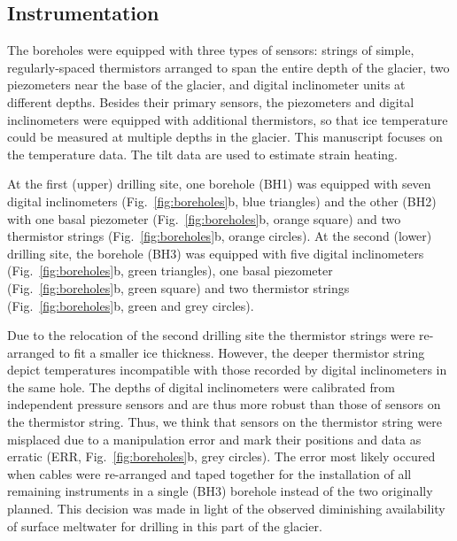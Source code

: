 \documentclass[utf8]{article}
\begin{document}
\subsection{Instrumentation}

    The boreholes were equipped with three types of sensors: strings of simple,
    regularly-spaced thermistors arranged to span the entire depth of the
    glacier, two piezometers near the base of the glacier, and digital
    inclinometer units at different depths. Besides their primary sensors, the
    piezometers and digital inclinometers were equipped with additional
    thermistors, so that ice temperature could be measured at multiple depths
    in the glacier. This manuscript focuses on the temperature data. The tilt
    data are used to estimate strain heating.

    At the first (upper) drilling site, one borehole (BH1) was equipped with
    seven digital inclinometers (Fig.~\ref{fig:boreholes}b, blue triangles) and
    the other (BH2) with one basal piezometer (Fig.~\ref{fig:boreholes}b,
    orange square) and two thermistor strings (Fig.~\ref{fig:boreholes}b,
    orange circles). At the second (lower) drilling site, the
    borehole (BH3) was equipped with five digital inclinometers
    (Fig.~\ref{fig:boreholes}b, green triangles), one basal piezometer
    (Fig.~\ref{fig:boreholes}b, green square) and two thermistor strings
    (Fig.~\ref{fig:boreholes}b, green and grey circles).

    Due to the relocation of the second drilling site the thermistor strings
    were re-arranged to fit a smaller ice thickness. However, the deeper
    thermistor string depict temperatures incompatible with those recorded by
    digital inclinometers in the same hole. The depths of digital inclinometers
    were calibrated from independent pressure sensors and are thus more robust
    than those of sensors on the thermistor string. Thus, we think that sensors
    on the thermistor string were misplaced due to a
    manipulation error and mark their positions and data as erratic (ERR,
    Fig.~\ref{fig:boreholes}b, grey circles). The error most likely occured
    when cables were re-arranged and taped together for the installation of
    all remaining instruments in a single (BH3) borehole
    instead of the two originally planned. This decision was made in light of
    the observed diminishing availability of surface meltwater for drilling in
    this part of the glacier.
\end{document}
